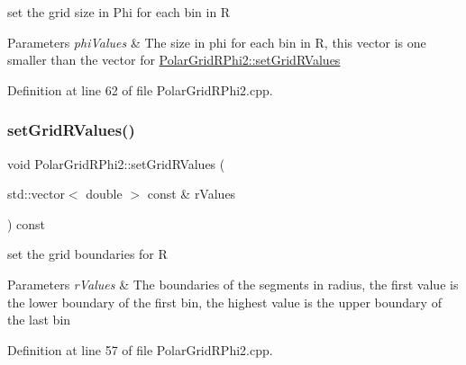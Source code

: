 set the grid size in Phi for each bin in R 


\begin{DoxyParams}{Parameters}
{\em phi\+Values} & The size in phi for each bin in R, this vector is one smaller than the vector for \hyperlink{class_d_d4hep_1_1_geometry_1_1_polar_grid_r_phi2_aa494a9648325629341dbcdcd91e43128}{Polar\+Grid\+R\+Phi2\+::set\+Grid\+R\+Values} \\
\hline
\end{DoxyParams}


Definition at line 62 of file Polar\+Grid\+R\+Phi2.\+cpp.

\hypertarget{class_d_d4hep_1_1_geometry_1_1_polar_grid_r_phi2_aa494a9648325629341dbcdcd91e43128}{}\label{class_d_d4hep_1_1_geometry_1_1_polar_grid_r_phi2_aa494a9648325629341dbcdcd91e43128} 
\subsubsection{\texorpdfstring{set\+Grid\+R\+Values()}{setGridRValues()}}
{\footnotesize\ttfamily void Polar\+Grid\+R\+Phi2\+::set\+Grid\+R\+Values (\begin{DoxyParamCaption}\item[{std\+::vector$<$ double $>$ const \&}]{r\+Values }\end{DoxyParamCaption}) const}



set the grid boundaries for R 


\begin{DoxyParams}{Parameters}
{\em r\+Values} & The boundaries of the segments in radius, the first value is the lower boundary of the first bin, the highest value is the upper boundary of the last bin \\
\hline
\end{DoxyParams}


Definition at line 57 of file Polar\+Grid\+R\+Phi2.\+cpp.

\hypertarget{class_d_d4hep_1_1_geometry_1_1_polar_grid_r_phi2_a217cad9744079f44c27ecceaf17cfd4d}{}\label{class_d_d4hep_1_1_geometry_1_1_polar_grid_r_phi2_a217cad9744079f44c27ecceaf17cfd4d} 
